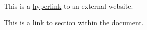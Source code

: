 \documentclass{article}
\begin{document}
This is a \href{https://example.com}{hyperlink} to an external website.

This is a \hyperref[section-1]{link to section} within the document.
\end{document}
